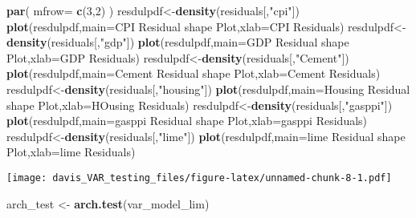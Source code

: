 \documentclass[
]{article}
\newenvironment{Shaded}{\begin{snugshade}}{\end{snugshade}}
\newcommand{\AttributeTok}[1]{\textcolor[rgb]{0.13,0.29,0.53}{#1}}
\newcommand{\DecValTok}[1]{\textcolor[rgb]{0.00,0.00,0.81}{#1}}
\newcommand{\FunctionTok}[1]{\textcolor[rgb]{0.13,0.29,0.53}{\textbf{#1}}}
\newcommand{\NormalTok}[1]{#1}
\newcommand{\OtherTok}[1]{\textcolor[rgb]{0.56,0.35,0.01}{#1}}
\newcommand{\StringTok}[1]{\textcolor[rgb]{0.31,0.60,0.02}{#1}}
\begin{document}
\begin{Shaded}
\begin{Highlighting}[]
\FunctionTok{par}\NormalTok{( }\AttributeTok{mfrow=} \FunctionTok{c}\NormalTok{(}\DecValTok{3}\NormalTok{,}\DecValTok{2}\NormalTok{) )}
\NormalTok{resdulpdf}\OtherTok{\textless{}{-}}\FunctionTok{density}\NormalTok{(residuals[,}\StringTok{"cpi"}\NormalTok{])}
\FunctionTok{plot}\NormalTok{(resdulpdf,}\AttributeTok{main=}\StringTok{\textquotesingle{}CPI Residual shape Plot\textquotesingle{}}\NormalTok{,}\AttributeTok{xlab=}\StringTok{\textquotesingle{}CPI Residuals\textquotesingle{}}\NormalTok{)}
\NormalTok{resdulpdf}\OtherTok{\textless{}{-}}\FunctionTok{density}\NormalTok{(residuals[,}\StringTok{"gdp"}\NormalTok{])}
\FunctionTok{plot}\NormalTok{(resdulpdf,}\AttributeTok{main=}\StringTok{\textquotesingle{}GDP Residual shape Plot\textquotesingle{}}\NormalTok{,}\AttributeTok{xlab=}\StringTok{\textquotesingle{}GDP Residuals\textquotesingle{}}\NormalTok{)}
\NormalTok{resdulpdf}\OtherTok{\textless{}{-}}\FunctionTok{density}\NormalTok{(residuals[,}\StringTok{"Cement"}\NormalTok{])}
\FunctionTok{plot}\NormalTok{(resdulpdf,}\AttributeTok{main=}\StringTok{\textquotesingle{}Cement Residual shape Plot\textquotesingle{}}\NormalTok{,}\AttributeTok{xlab=}\StringTok{\textquotesingle{}Cement Residuals\textquotesingle{}}\NormalTok{)}
\NormalTok{resdulpdf}\OtherTok{\textless{}{-}}\FunctionTok{density}\NormalTok{(residuals[,}\StringTok{"housing"}\NormalTok{])}
\FunctionTok{plot}\NormalTok{(resdulpdf,}\AttributeTok{main=}\StringTok{\textquotesingle{}Housing Residual shape Plot\textquotesingle{}}\NormalTok{,}\AttributeTok{xlab=}\StringTok{\textquotesingle{}HOusing Residuals\textquotesingle{}}\NormalTok{)}
\NormalTok{resdulpdf}\OtherTok{\textless{}{-}}\FunctionTok{density}\NormalTok{(residuals[,}\StringTok{"gasppi"}\NormalTok{])}
\FunctionTok{plot}\NormalTok{(resdulpdf,}\AttributeTok{main=}\StringTok{\textquotesingle{}gasppi Residual shape Plot\textquotesingle{}}\NormalTok{,}\AttributeTok{xlab=}\StringTok{\textquotesingle{}gasppi Residuals\textquotesingle{}}\NormalTok{)}
\NormalTok{resdulpdf}\OtherTok{\textless{}{-}}\FunctionTok{density}\NormalTok{(residuals[,}\StringTok{"lime"}\NormalTok{])}
\FunctionTok{plot}\NormalTok{(resdulpdf,}\AttributeTok{main=}\StringTok{\textquotesingle{}lime Residual shape Plot\textquotesingle{}}\NormalTok{,}\AttributeTok{xlab=}\StringTok{\textquotesingle{}lime Residuals\textquotesingle{}}\NormalTok{)}
\end{Highlighting}
\end{Shaded}

\texttt{[image: davis\_VAR\_testing\_files/figure-latex/unnamed-chunk-8-1.pdf]}

\begin{Shaded}
\begin{Highlighting}[]
\NormalTok{arch\_test }\OtherTok{\textless{}{-}} \FunctionTok{arch.test}\NormalTok{(var\_model\_lim)}
\end{Highlighting}
\end{Shaded}
\end{document}
